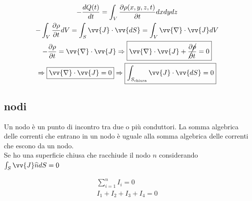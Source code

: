 \documentclass[a4paper, oneside]{article}
\begin{document}
\begin{gather*}
    -\frac{dQ(t)}{dt} = \int_V \frac{\partial \rho(x,y,z,t)}{\partial t} dx dy dz\\
    -\int_V \frac{\partial \rho}{\partial t} dV = \int_S \vv{J} \cdot \vv{dS} = \int_V \vv{\nabla} \cdot \vv{J} dV\\
    -\frac{\partial \rho}{\partial t} = \vv{\nabla} \cdot \vv{J} \Rightarrow \boxed{\vv{\nabla} \cdot \vv{J} + \cancel{\frac{\partial \rho}{\partial t}} = 0}\\
    \Rightarrow \boxed{\vv{\nabla} \cdot \vv{J} = 0} \Rightarrow \boxed{\int_{S_\text{chiusa}} \vv{J} \cdot \vv{dS} = 0}
\end{gather*}
\subsection{nodi}
Un nodo è un punto di incontro tra due o più conduttori.
La somma algebrica delle correnti che entrano in un nodo è uguale alla somma algebrica delle correnti che escono da un nodo.\\
Se ho una superficie chiusa che racchiude il nodo $n$ considerando $\int_S \vv{J} \widehat{n} dS = 0$
\begin{center}
\end{center}
\begin{gather*}
    \sum_{i=1}^n I_i = 0\\
    I_1 + I_2 + I_3 + I_4 = 0
\end{gather*}
\end{document}
